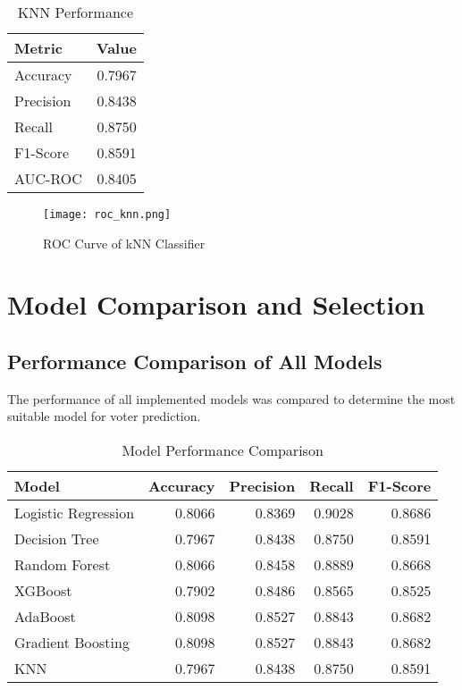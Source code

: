 \documentclass[12pt]{article}
\begin{document}
\begin{table}[H]
\centering
\caption{KNN Performance}
\label{tab:knn_perf}
\begin{tabular}{lr}
\toprule
\textbf{Metric} & \textbf{Value} \\
\midrule
Accuracy & 0.7967 \\
Precision & 0.8438 \\
Recall & 0.8750 \\
F1-Score & 0.8591 \\
AUC-ROC & 0.8405 \\
\bottomrule
\end{tabular}
\end{table}

\begin{figure}[H]
    \centering
    \texttt{[image: roc\_knn.png]}
    \caption{ROC Curve of kNN Classifier}
    \label{fig:example}
\end{figure}


\section{Model Comparison and Selection}

\subsection{Performance Comparison of All Models}
The performance of all implemented models was compared to determine the most suitable model for voter prediction.

\begin{table}[h]
\centering
\caption{Model Performance Comparison}
\label{tab:model_comp}
\begin{tabular}{lrrrr}
\toprule
\textbf{Model} & \textbf{Accuracy} & \textbf{Precision} & \textbf{Recall} & \textbf{F1-Score} \\
\midrule
Logistic Regression & 0.8066 & 0.8369 & 0.9028 & 0.8686 \\
Decision Tree  & 0.7967 & 0.8438 & 0.8750 & 0.8591 \\
Random Forest & 0.8066 & 0.8458 & 0.8889 & 0.8668 \\
XGBoost & 0.7902 & 0.8486 & 0.8565 & 0.8525 \\
AdaBoost & 0.8098 & 0.8527 & 0.8843 & 0.8682 \\
Gradient Boosting & 0.8098 & 0.8527 & 0.8843 & 0.8682 \\
KNN & 0.7967 & 0.8438 & 0.8750 & 0.8591 \\
\bottomrule
\end{tabular}
\end{table}
\end{document}
